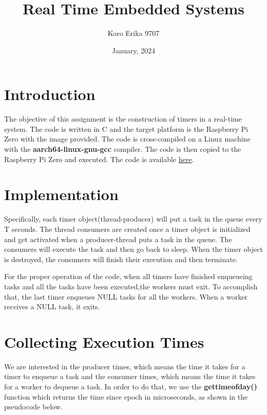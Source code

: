 \documentclass[12pt, a4paper]{report}
\title{\Large{\textbf{Real Time Embedded Systems}}}
\author{Koro Erika 9707}
\date{January, 2024}
\begin{document}
    \maketitle
    
    \section*{Introduction}
    The objective of this assignment is the construction of timers in a real-time system. The code is written in C
    and the target platform is the Raspberry Pi Zero with
    the image provided. The code is cross-compiled on a Linux machine with the \textbf{aarch64-linux-gnu-gcc} compiler.
    The code is then copied to the Raspberry Pi Zero and executed. The code is available \href{https://github.com/ErikaKoro/EmbeddedSystems2}{here}.
    

    \section*{Implementation}
    Specifically, each timer object(thread-producer) will put a task in the queue every T seconds.
    The thread consumers are created once a timer object is initialized and get activated when a producer-thread
    puts a task in the queue. The consumers will execute
    the task and then go back to sleep. When the timer object is destroyed, the consumers will finish their execution and then terminate.

    For the proper operation of the code, when all timers have finished enqueueing tasks and all the tasks have been executed,the workers must exit.
    To accomplish that, the last timer enqueues NULL tasks for all the workers. When a worker receives a NULL task, it exits.

    \section*{Collecting Execution Times}
    We are interested in the producer times, which means the time it takes for a timer to enqueue a task and the consumer times,
    which means the time it takes for a worker to dequeue a task. In order to do that,
    we use the \textbf{gettimeofday()} function which returns the time since epoch in microseconds, as shown in the pseudocode below.
    
\end{document}
